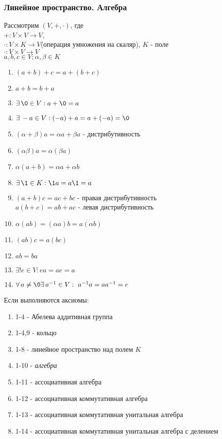 \documentclass[12pt]{article}
\begin{document}
\subsubsection{Линейное пространство. Алгебра}
Рассмотрим $(V,+,\cdot)$, где \\
$+: V\times V \rightarrow V$, \\
$\cdot: V\times K \rightarrow V$(операция умножения на скаляр), $K$ - поле\\
$\cdot: V\times V \rightarrow V$\\
$a,b,c \in V; \alpha,\beta \in K$
\begin{enumerate}
    \item $(a+b)+c=a+(b+c)$
    \item $a+b=b+a$
    \item $\exists\,\0\in V: a+\0=a$
    \item $\exists\,-a\in V: (-a)+a=a+(-a)=\0$
    \item $(\alpha+\beta)a=\alpha a + \beta a$ - дистрибутивность
    \item $(\alpha\beta)a=\alpha(\beta a)$
    \item $\alpha(a+b)=\alpha a + \alpha b$
    \item $\exists\,\1 \in K: \1a = a\1=a$
    \item $(a+b)c=ac+bc$ - правая дистрибутивность\\
    $a(b+c)=ab+ac$ - левая дистрибутивность
    \item $\alpha(ab)=(\alpha a)b=a(\alpha b)$
    \item $(ab)c=a(bc)$
    \item $ab=ba$
    \item $\exists! e\in V: ea=ae=a$
    \item $\forall\,a\neq \0 \exists\,a^{-1}\in V:\ a^{-1}a=aa^{-1}=e$
\end{enumerate}
Если выполняются аксиомы:
\begin{enumerate}
    \item 1-4 - Абелева аддитивная группа
    \item 1-4,9 - кольцо
    \item 1-8 - линейное пространство над полем $K$
    \item 1-10 - \textit{алгебра}
    \item 1-11 - ассоциативная алгебра
    \item 1-12 - ассоциативная коммутативная алгебра
    \item 1-13 - ассоциативная коммутативная унитальная алгебра
    \item 1-14 - ассоциативная коммутативная унитальная алгебра с делением
\end{enumerate}
\end{document}

